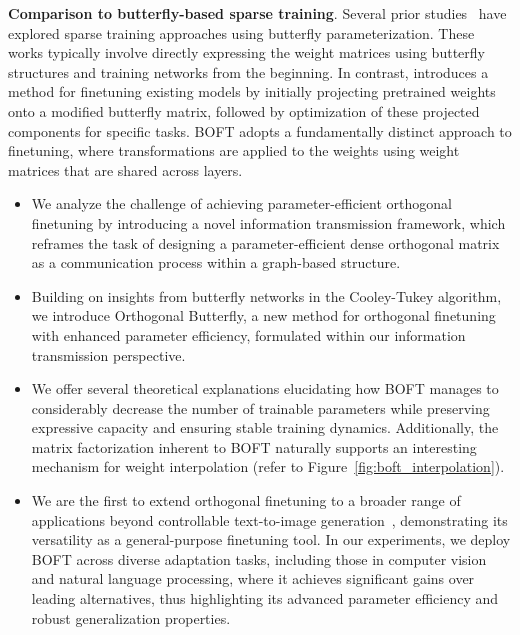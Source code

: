 \textbf{Comparison to butterfly-based sparse training}. Several prior studies~\cite{dao2019learning,dao2019kaleidoscope,chen2022pixelated,dao2022monarch} have explored sparse training approaches using butterfly parameterization. These works typically involve directly expressing the weight matrices using butterfly structures and training networks from the beginning. In contrast, \cite{dao2022monarch} introduces a method for finetuning existing models by initially projecting pretrained weights onto a modified butterfly matrix, followed by optimization of these projected components for specific tasks. BOFT adopts a fundamentally distinct approach to finetuning, where transformations are applied to the weights using weight matrices that are shared across layers.

\begin{itemize}[leftmargin=*,nosep]
    \item We analyze the challenge of achieving parameter-efficient orthogonal finetuning by introducing a novel information transmission framework, which reframes the task of designing a parameter-efficient dense orthogonal matrix as a communication process within a graph-based structure.
    \item Building on insights from butterfly networks in the Cooley-Tukey algorithm, we introduce Orthogonal Butterfly, a new method for orthogonal finetuning with enhanced parameter efficiency, formulated within our information transmission perspective.
    \item We offer several theoretical explanations elucidating how BOFT manages to considerably decrease the number of trainable parameters while preserving expressive capacity and ensuring stable training dynamics. Additionally, the matrix factorization inherent to BOFT naturally supports an interesting mechanism for weight interpolation (refer to Figure~\ref{fig:boft_interpolation}).
    \item We are the first to extend orthogonal finetuning to a broader range of applications beyond controllable text-to-image generation~\cite{qiu2023controlling}, demonstrating its versatility as a general-purpose finetuning tool. In our experiments, we deploy BOFT across diverse adaptation tasks, including those in computer vision and natural language processing, where it achieves significant gains over leading alternatives, thus highlighting its advanced parameter efficiency and robust generalization properties.
\end{itemize}

